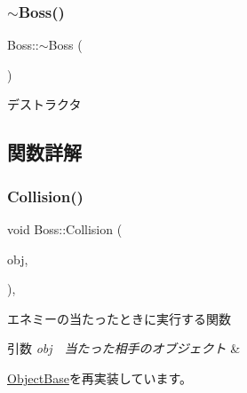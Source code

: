 \mbox{\label{class_boss_ae2300fbed7e29873d66c5a89beb3a628}} 
\subsubsection{\texorpdfstring{$\sim$\+Boss()}{~Boss()}}
{\footnotesize\ttfamily Boss\+::$\sim$\+Boss (\begin{DoxyParamCaption}{ }\end{DoxyParamCaption})\hspace{0.3cm}{\ttfamily [inline]}}



デストラクタ 



\subsection{関数詳解}
\mbox{\label{class_boss_a36b664185c0aa3ae4c6fc58c33d8485b}} 
\subsubsection{\texorpdfstring{Collision()}{Collision()}}
{\footnotesize\ttfamily void Boss\+::\+Collision (\begin{DoxyParamCaption}\item[{\mbox{\hyperlink{class_object_base}{Object\+Base}} $\ast$}]{obj,  }\item[{\mbox{\hyperlink{common_8h_ae148fff5818e9444b4ab2288829559bf}{Vec2}}}]{ }\end{DoxyParamCaption})\hspace{0.3cm}{\ttfamily [final]}, {\ttfamily [virtual]}}



エネミーの当たったときに実行する関数 


\begin{DoxyParams}{引数}
{\em obj　当たった相手のオブジェクト} & \\
\hline
\end{DoxyParams}


\mbox{\hyperlink{class_object_base_a3e1db79dfa119be067d816c22d09839d}{Object\+Base}}を再実装しています。

\mbox{\label{class_boss_afe7a503ea624c30c2a50b58b40acfb48}} 

